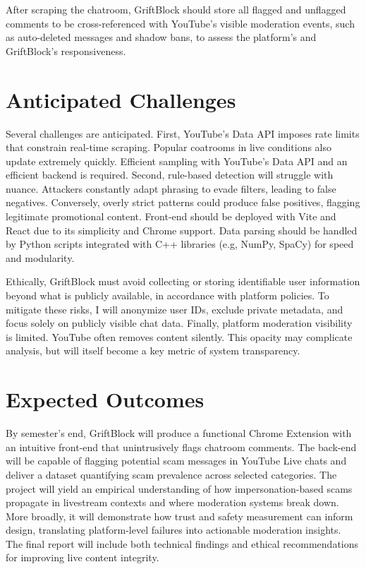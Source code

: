 \documentclass[letterpaper,twocolumn,10pt]{article}
\begin{document}
After scraping the chatroom, GriftBlock should store all flagged and unflagged comments to be cross-referenced with YouTube’s visible moderation events, such as auto-deleted messages and shadow bans, to assess the platform’s and GriftBlock’s responsiveness.

\section{Anticipated Challenges}

Several challenges are anticipated. First, YouTube’s Data API imposes rate limits that constrain real-time scraping. Popular coatrooms in live conditions also update extremely quickly. Efficient sampling with YouTube's Data API and an efficient backend is required. Second, rule-based detection will struggle with nuance. Attackers constantly adapt phrasing to evade filters, leading to false negatives. Conversely, overly strict patterns could produce false positives, flagging legitimate promotional content. Front-end should be deployed with Vite and React due to its simplicity and Chrome support. Data parsing should be handled by Python scripts integrated with C++ libraries (e.g, NumPy, SpaCy) for speed and modularity.

Ethically, GriftBlock must avoid collecting or storing identifiable user information beyond what is publicly available, in accordance with platform policies. To mitigate these risks, I will anonymize user IDs, exclude private metadata, and focus solely on publicly visible chat data. Finally, platform moderation visibility is limited. YouTube often removes content silently. This opacity may complicate analysis, but will itself become a key metric of system transparency.

\section{Expected Outcomes}

By semester’s end, GriftBlock will produce a functional Chrome Extension with an intuitive front-end that unintrusively flags chatroom comments. The back-end will be capable of flagging potential scam messages in YouTube Live chats and deliver a dataset quantifying scam prevalence across selected categories. The project will yield an empirical understanding of how impersonation-based scams propagate in livestream contexts and where moderation systems break down. More broadly, it will demonstrate how trust and safety measurement can inform design, translating platform-level failures into actionable moderation insights. The final report will include both technical findings and ethical recommendations for improving live content integrity.
\end{document}

